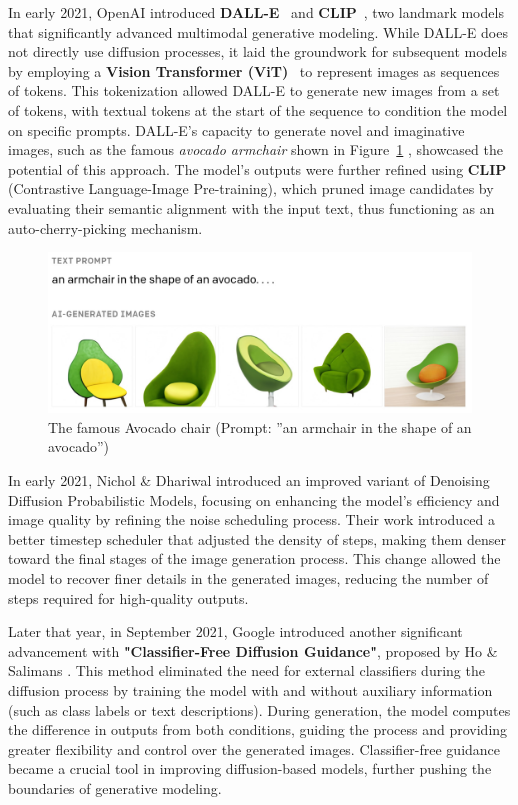 \documentclass[12pt,DIV14,BCOR12mm,a4paper,footinclude=false,headinclude,parskip=half-,twoside,openright,cleardoublepage=empty,toc=index,bibliography=totoc,listof=totoc]{scrreprt}
\numberwithin{equation}{chapter}
\begin{document}
In early 2021, OpenAI introduced \textbf{DALL-E}~\cite{DALL_E} and \textbf{CLIP}~\cite{CLIP}, two landmark models that significantly advanced multimodal generative modeling. While DALL-E does not directly use diffusion processes, it laid the groundwork for subsequent models by employing a \textbf{Vision Transformer (ViT)}~\cite{ViT} to represent images as sequences of tokens. This tokenization allowed DALL-E to generate new images from a set of tokens, with textual tokens at the start of the sequence to condition the model on specific prompts. DALL-E's capacity to generate novel and imaginative images, such as the famous \emph{avocado armchair} shown in Figure~\ref{AvacadoArmchair} , showcased the potential of this approach. The model's outputs were further refined using \textbf{CLIP} (Contrastive Language-Image Pre-training), which pruned image candidates by evaluating their semantic alignment with the input text, thus functioning as an auto-cherry-picking mechanism.
\begin{figure}
	\centering
	\includegraphics[scale=.3]{../media/DallE-AvacadoArmchair_1208x459.jpg}
	\caption{The famous Avocado chair (Prompt: ”an armchair in the shape of an avocado”)~\cite{openai2021}}
	\label{AvacadoArmchair}
\end{figure}

In early 2021, Nichol \& Dhariwal introduced an improved variant of Denoising Diffusion Probabilistic Models, focusing on enhancing the model's efficiency and image quality by refining the noise scheduling process\cite{Improved_denoising_diffusion}. Their work introduced a better timestep scheduler that adjusted the density of steps, making them denser toward the final stages of the image generation process. This change allowed the model to recover finer details in the generated images, reducing the number of steps required for high-quality outputs.

Later that year, in September 2021, Google introduced another significant advancement with \textbf{"Classifier-Free Diffusion Guidance"}, proposed by Ho \& Salimans \cite{ho2022classifier}. This method eliminated the need for external classifiers during the diffusion process by training the model with and without auxiliary information (such as class labels or text descriptions). During generation, the model computes the difference in outputs from both conditions, guiding the process and providing greater flexibility and control over the generated images. Classifier-free guidance became a crucial tool in improving diffusion-based models, further pushing the boundaries of generative modeling.
\end{document}
